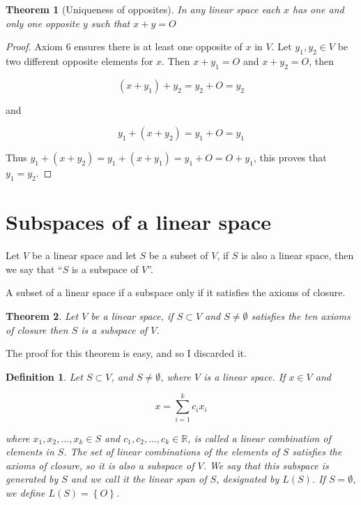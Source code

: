 \documentclass{book}
\newtheorem{theorem}{Theorem}[chapter]
\newtheorem{definition}{Definition}[chapter]
\begin{document}
\begin{theorem}[Uniqueness of opposites]
    In any linear space each $x$ has one and only one opposite $y$ such that $x+y=O$
\end{theorem}

\begin{proof}
    Axiom 6 ensures there is at least one opposite of $x$ in $V$. Let $y_1,y_2\in V$
    be two different opposite elements for $x$. Then $x+y_1=O$ and $x+y_2=O$, then

    \[
        (x + y_1) + y_2 = y_2 + O = y_2
    \]

    and

    \[
        y_1 + (x+y_2) = y_1 + O = y_1
    \]

    Thus $y_1 + (x+y_2) = y_1 + (x+y_1) = y_1 + O = O + y_1$, this proves that $y_1
        = y_2$.
\end{proof}

\section{Subspaces of a linear space}

Let $V$ be a linear space and let $S$ be a subset of $V$, if $S$ is also a
linear space, then we say that ``$S$ is a subspace of $V$''.

A subset of a linear space if a subspace only if it satisfies the axioms of
closure.

\begin{theorem}
    Let $V$ be a linear space, if $S\subset V$ and $S \neq \emptyset$ satisfies
    the ten axioms of closure then $S$ is a subspace of $V$.
\end{theorem}

The proof for this theorem is easy, and so I discarded it.

\begin{definition}
    Let $S\subset V$, and $S\neq \emptyset$, where $V$ is a linear space. If $x\in V$ and

    \[
        x=\sum_{i=1}^{k}{c_i x_i}
    \]

    where $x_1,x_2,\dots,x_k \in S$ and $c_1,c_2,\dots,c_k\in \mathbb{R}$, is
    called a \textit{linear combination of elements in $S$}. The set of linear
    combinations of the elements of $S$ satisfies the axioms of closure, so it is
    also a subspace of $V$.\textit{ We say that this subspace is generated by $S$
        and we call it the linear span of $S$, designated by $L(S)$.} If $S=\emptyset$,
    we define $L(S)=\left\{O\right\}$.
\end{definition}
\end{document}
